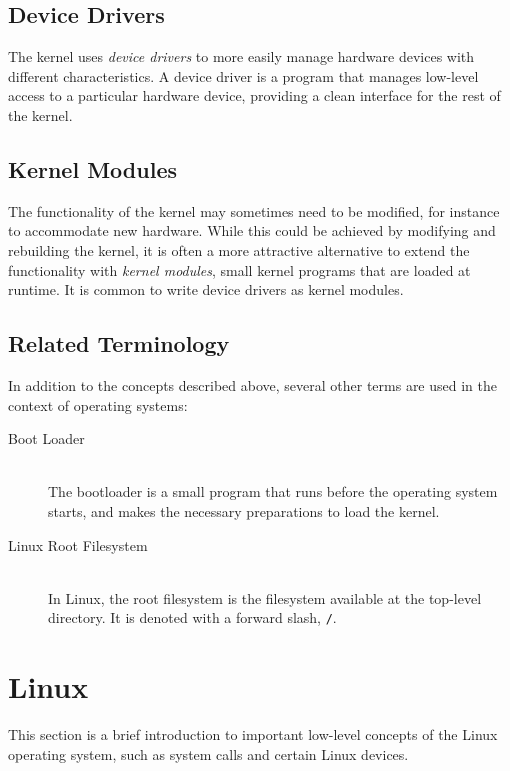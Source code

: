 \subsection{Device Drivers}
The kernel uses \emph{device drivers} to more easily manage hardware devices with different characteristics. A device driver is a program that manages low-level access to a particular hardware device, providing a clean interface for the rest of the kernel.

\subsection{Kernel Modules}\label{sec:kernel-modules}
The functionality of the kernel may sometimes need to be modified, for instance to accommodate new hardware. While this could be achieved by modifying and rebuilding the kernel, it is often a more attractive alternative to extend the functionality with \emph{kernel modules}, small kernel programs that are loaded at runtime. It is common to write device drivers as kernel modules.

\subsection{Related Terminology}
In addition to the concepts described above, several other terms are used in the context of operating systems:
\begin{description}
\item[Boot Loader] \hfill \\
The bootloader is a small program that runs before the operating system starts, and makes the necessary preparations to load the kernel.
\item[Linux Root Filesystem] \hfill \\
 In Linux, the root filesystem is the filesystem available at the top-level directory. It is denoted with a forward slash, \texttt{/}.
\end{description}



\section{Linux}
This section is a brief introduction to important low-level concepts of the Linux operating system, such as system calls and certain Linux devices.

